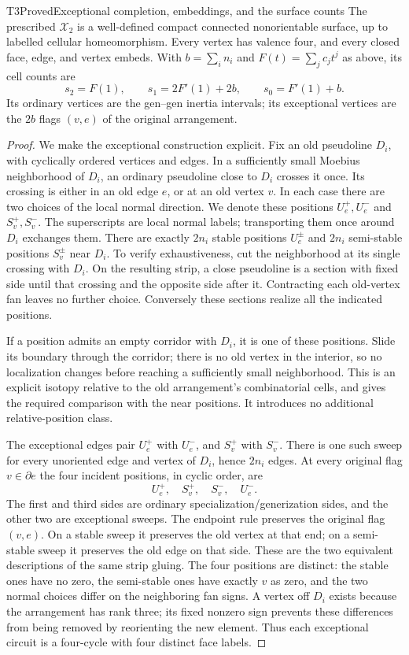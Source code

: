 \begin{resultenv}{T3}{Proved}{Exceptional completion, embeddings, and the surface counts}
The prescribed $\mathcal X_2$ is a well-defined compact connected
nonorientable surface, up to labelled cellular homeomorphism. Every
vertex has valence four, and every closed face, edge, and vertex embeds.
With $b=\sum_i n_i$ and $F(t)=\sum_j c_jt^j$ as above, its cell counts are
\[
 s_2=F(1),\qquad s_1=2F'(1)+2b,\qquad s_0=F'(1)+b.
\]
Its ordinary vertices are the gen--gen inertia intervals; its exceptional
vertices are the $2b$ flags $(v,e)$ of the original arrangement.
\end{resultenv}
\begin{proof}
We make the exceptional construction explicit. Fix an old pseudoline
$D_i$, with cyclically ordered vertices and edges. In a sufficiently
small Moebius neighborhood of $D_i$, an ordinary pseudoline close to
$D_i$ crosses it once. Its crossing is either in an old edge $e$, or at
an old vertex $v$. In each case there are two choices of the local
normal direction. We denote these positions $U_e^+,U_e^-$ and
$S_v^+,S_v^-$. The superscripts are local normal labels; transporting
them once around $D_i$ exchanges them. There are exactly $2n_i$ stable
positions $U_e^\pm$ and $2n_i$ semi-stable positions $S_v^\pm$ near
$D_i$. To verify exhaustiveness, cut the neighborhood at its single
crossing with $D_i$. On the resulting strip, a close pseudoline is a
section with fixed side until that crossing and the opposite side
after it. Contracting each old-vertex fan leaves no further choice.
Conversely these sections realize all the indicated positions.

If a position admits an empty corridor with $D_i$, it is one of these
positions. Slide its boundary through the corridor; there is no old
vertex in the interior, so no localization changes before reaching
a sufficiently small neighborhood. This is an explicit isotopy
relative to the old arrangement's combinatorial cells, and gives
the required comparison with the near positions. It introduces no
additional relative-position class.

The exceptional edges pair $U_e^+$ with $U_e^-$, and $S_v^+$ with
$S_v^-$. There is one such sweep for every unoriented edge and vertex
of $D_i$, hence $2n_i$ edges. At every original flag $v\in\partial e$
the four incident positions, in cyclic order, are
\[
 U_e^+,\quad S_v^+,\quad S_v^-,\quad U_e^-.
\]
The first and third sides are ordinary specialization/generization
sides, and the other two are exceptional sweeps. The endpoint rule
preserves the original flag $(v,e)$. On a stable sweep it preserves
the old vertex at that end; on a semi-stable sweep it preserves the
old edge on that side. These are the two equivalent descriptions of
the same strip gluing. The four positions are distinct: the stable
ones have no zero, the semi-stable ones have exactly $v$ as zero,
and the two normal choices differ on the neighboring fan signs.
A vertex off $D_i$ exists because the arrangement has rank three;
its fixed nonzero sign prevents these differences from being removed
by reorienting the new element. Thus each exceptional circuit is a
four-cycle with four distinct face labels.


\end{proof}
